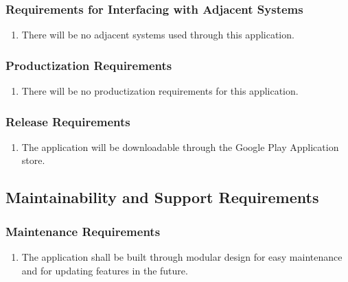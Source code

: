 \documentclass[12pt, titlepage]{article}
\begin{document}
\subsubsection{Requirements for Interfacing with Adjacent Systems}
\label{ssub:requirements_for_interfacing_with_adjacent_systems}
\begin{enumerate}[{OE}1. ]
	\item There will be no adjacent systems used through this application.
\end{enumerate}

\subsubsection{Productization Requirements}
\label{ssub:productization_requirements}
\begin{enumerate}[{OE}1. ]
	\item There will be no productization requirements for this application.
\end{enumerate}

\subsubsection{Release Requirements}
\label{ssub:release_requirements}
\begin{enumerate}[{OE}1. ]
	\item The application will be downloadable through the Google Play Application store.
\end{enumerate}


\subsection{Maintainability and Support Requirements}
\label{sub:maintainability_and_support_requirements}

\subsubsection{Maintenance Requirements}
\label{ssub:maintenance_requirements}
\begin{enumerate}[{MS}1. ]
	\item The application shall be built through modular design for easy maintenance and for updating features in the future.
\end{enumerate}
\end{document}
